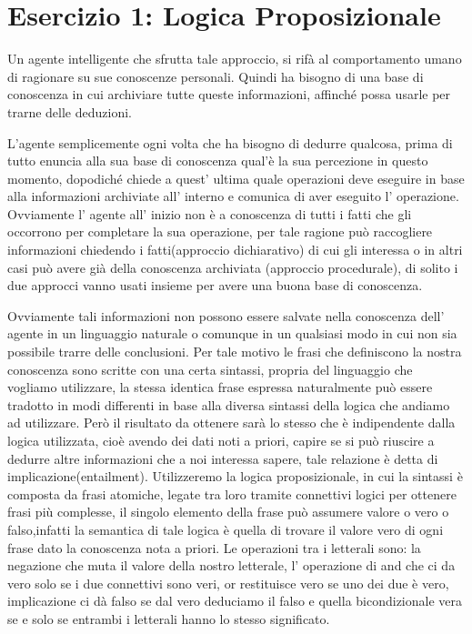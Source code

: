 \raggedright
{}
	\label{ch:opt}
	\section{Esercizio 1: Logica Proposizionale}
		\label{sec:es1}
		Un agente intelligente che sfrutta tale approccio, si rifà al comportamento umano di ragionare su sue conoscenze personali. Quindi ha bisogno di una base di conoscenza in cui archiviare tutte queste informazioni, affinché possa usarle per trarne delle deduzioni.
		\par
		L'agente semplicemente ogni volta che ha bisogno di dedurre qualcosa, prima di tutto enuncia alla sua base di conoscenza qual'è la sua percezione in questo momento, dopodiché chiede a quest' ultima quale operazioni deve eseguire in base alla informazioni archiviate all' interno e comunica  di aver eseguito l' operazione. Ovviamente l' agente all' inizio non è a conoscenza di tutti i fatti che gli occorrono per completare la sua operazione, per tale ragione può raccogliere informazioni chiedendo i fatti(approccio dichiarativo) di cui gli interessa o in altri casi può avere già della conoscenza archiviata (approccio procedurale), di solito i due approcci vanno usati insieme per avere una buona base di conoscenza.
		\par
		Ovviamente tali informazioni non possono essere salvate nella conoscenza dell' agente in un linguaggio naturale o comunque in un qualsiasi modo in cui non sia possibile trarre delle conclusioni. Per tale motivo le frasi che definiscono la nostra conoscenza sono scritte con una certa sintassi, propria del linguaggio che vogliamo utilizzare, la stessa identica frase espressa naturalmente può essere tradotto in modi differenti in base alla diversa sintassi della logica che andiamo ad utilizzare. Però il risultato da ottenere sarà lo stesso che è indipendente dalla logica utilizzata, cioè avendo dei dati noti a priori, capire se si può riuscire a dedurre altre informazioni che a noi interessa sapere, tale relazione è detta di implicazione(entailment). Utilizzeremo la logica proposizionale, in cui la sintassi è composta da frasi atomiche, legate tra loro tramite connettivi logici per ottenere frasi più complesse, il singolo elemento della frase può assumere valore o vero o falso,infatti la semantica di tale logica è quella di trovare il valore vero di ogni frase dato la conoscenza nota a priori. Le operazioni tra i letterali sono: la negazione che muta il valore della nostro letterale, l' operazione di and che ci da vero solo se i due connettivi sono veri, or restituisce vero se uno dei due è vero, implicazione ci dà falso se dal vero deduciamo il falso e quella bicondizionale vera se e solo se entrambi i letterali hanno lo stesso significato.
